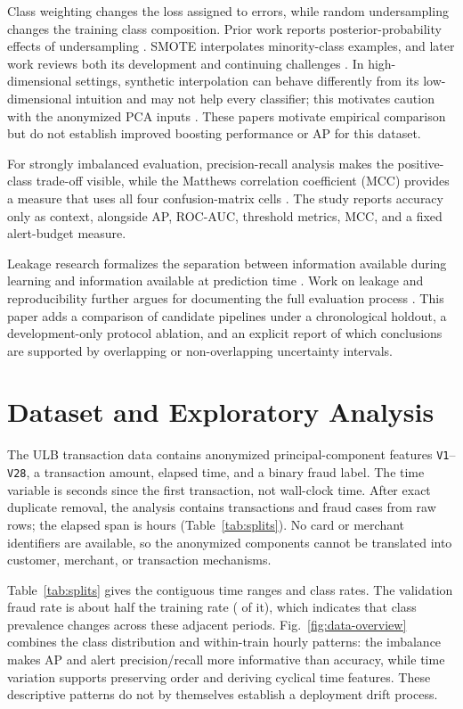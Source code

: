 \documentclass[journal]{IEEEtran}
\begin{document}
Class weighting changes the loss assigned to errors, while random undersampling changes the training class composition. Prior work reports posterior-probability effects of undersampling \cite{dalpozzo2015}. SMOTE interpolates minority-class examples, and later work reviews both its development and continuing challenges \cite{chawla2002,fernandez2018smote}. In high-dimensional settings, synthetic interpolation can behave differently from its low-dimensional intuition and may not help every classifier; this motivates caution with the anonymized PCA inputs \cite{blagus2013smote}. These papers motivate empirical comparison but do not establish improved boosting performance or AP for this dataset.

For strongly imbalanced evaluation, precision-recall analysis makes the positive-class trade-off visible, while the Matthews correlation coefficient (MCC) provides a measure that uses all four confusion-matrix cells \cite{saito2015,chicco2020}. The study reports accuracy only as context, alongside AP, ROC-AUC, threshold metrics, MCC, and a fixed alert-budget measure.

Leakage research formalizes the separation between information available during learning and information available at prediction time \cite{kaufman2012}. Work on leakage and reproducibility further argues for documenting the full evaluation process \cite{kapoor2022}. This paper adds a comparison of candidate pipelines under a chronological holdout, a development-only protocol ablation, and an explicit report of which conclusions are supported by overlapping or non-overlapping uncertainty intervals.
\FloatBarrier

\section{Dataset and Exploratory Analysis}
\label{sec:data}
The ULB transaction data contains anonymized principal-component features \texttt{V1}--\texttt{V28}, a transaction amount, elapsed time, and a binary fraud label. The time variable is seconds since the first transaction, not wall-clock time. After exact duplicate removal, the analysis contains \DataRows{} transactions and \FraudCount{} fraud cases from \RawRows{} raw rows; the elapsed span is \TimeSpanHours{} hours (Table~\ref{tab:splits}). No card or merchant identifiers are available, so the anonymized components cannot be translated into customer, merchant, or transaction mechanisms.

Table~\ref{tab:splits} gives the contiguous time ranges and class rates. The validation fraud rate is about half the training rate (\ValidationFraudRateRatio{} of it), which indicates that class prevalence changes across these adjacent periods. Fig.~\ref{fig:data-overview} combines the class distribution and within-train hourly patterns: the imbalance makes AP and alert precision/recall more informative than accuracy, while time variation supports preserving order and deriving cyclical time features. These descriptive patterns do not by themselves establish a deployment drift process.
\end{document}
